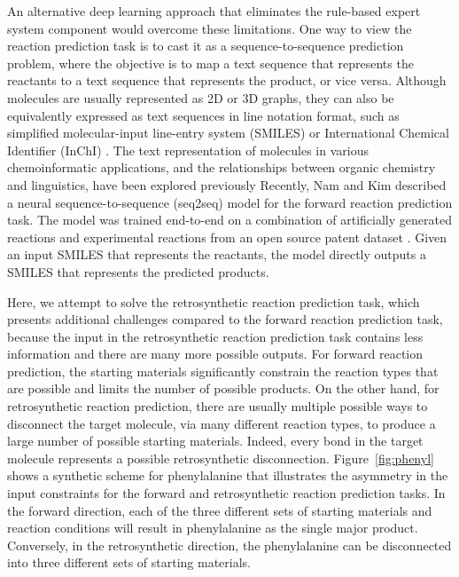 An alternative deep learning approach that eliminates the rule-based expert system component would overcome these limitations. One way to view the reaction prediction task is to cast it as a sequence-to-sequence prediction problem, where the objective is to map a text sequence that represents the reactants to a text sequence that represents the product, or vice versa. Although molecules are usually represented as 2D or 3D graphs, they can also be equivalently expressed as text sequences in line notation format, such as simplified molecular-input line-entry system (SMILES) \cite{weininger1988smiles} or International Chemical Identifier (InChI) \cite{heller2013inchi}. The text representation of molecules in various chemoinformatic applications, and the relationships between organic chemistry and linguistics, have been explored previously \cite{gomez2016automatic, ikebata2017bayesian, jastrzkebski2016learning, bjerrum2017smiles, segler2017generating, cadeddu2014organic} Recently, Nam and Kim \cite{nam2016linking} described a neural sequence-to-sequence (seq2seq) model for the forward reaction prediction task. The model was trained end-to-end on a combination of artificially generated reactions and experimental reactions from an open source patent dataset \cite{lowe2012extraction}. Given an input SMILES that represents the reactants, the model directly outputs a SMILES that represents the predicted products.

Here, we attempt to solve the retrosynthetic reaction prediction task, which presents additional challenges compared to the forward reaction prediction task, because the input in the retrosynthetic reaction prediction task contains less information and there are many more possible outputs. For forward reaction prediction, the starting materials significantly constrain the reaction types that are possible and limits the number of possible products. On the other hand, for retrosynthetic reaction prediction, there are usually multiple possible ways to disconnect the target molecule, via many different reaction types, to produce a large number of possible starting materials. Indeed, every bond in the target molecule represents a possible retrosynthetic disconnection. Figure~\ref{fig:phenyl} shows a synthetic scheme for phenylalanine that illustrates the asymmetry in the input constraints for the forward and retrosynthetic reaction prediction tasks. In the forward direction, each of the three different sets of starting materials and reaction conditions will result in phenylalanine as the single major product. Conversely, in the retrosynthetic direction, the phenylalanine can be disconnected into three different sets of starting materials. 


